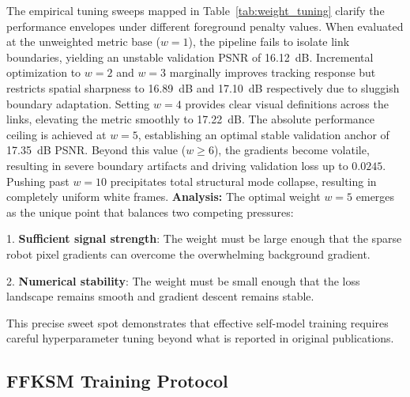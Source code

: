 \documentclass[12pt,a4paper,oneside]{report}
\begin{document}
The empirical tuning sweeps mapped in Table~\ref{tab:weight_tuning} clarify the performance envelopes under different foreground penalty values. When evaluated at the unweighted metric base ($w=1$), the pipeline fails to isolate link boundaries, yielding an unstable validation PSNR of 16.12~dB. Incremental optimization to $w=2$ and $w=3$ marginally improves tracking response but restricts spatial sharpness to 16.89~dB and 17.10~dB respectively due to sluggish boundary adaptation. Setting $w=4$ provides clear visual definitions across the links, elevating the metric smoothly to 17.22~dB. The absolute performance ceiling is achieved at $w=5$, establishing an optimal stable validation anchor of 17.35~dB PSNR. Beyond this value ($w \ge 6$), the gradients become volatile, resulting in severe boundary artifacts and driving validation loss up to $0.0245$. Pushing past $w=10$ precipitates total structural mode collapse, resulting in completely uniform white frames.
\textbf{Analysis:} The optimal weight $w = 5$ emerges as the unique point that balances two competing pressures:

1. \textbf{Sufficient signal strength}: The weight must be large enough that the sparse robot pixel gradients can overcome the overwhelming background gradient.

2. \textbf{Numerical stability}: The weight must be small enough that the loss landscape remains smooth and gradient descent remains stable.

This precise sweet spot demonstrates that effective self-model training requires careful hyperparameter tuning beyond what is reported in original publications.
\subsection{FFKSM Training Protocol}
\label{subsec:ffksm_training_protocol}
\end{document}
